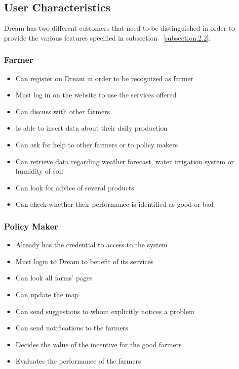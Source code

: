 \subsection{User Characteristics}
Dream has two different customers that need to be 
distinguished in order to provide the various 
features specified in subsection ~\ref{subsection:2.2}.

\subsubsection{Farmer}
\begin{itemize}
    \renewcommand\labelitemi{--}
    \item Can register on Dream in order to be recognized as farmer
    \item Must log in on the website to use the services offered
    \item Can discuss with other farmers
    \item Is able to insert data about their daily production
    \item Can ask for help to other farmers or to policy makers
    \item Can retrieve data regarding weather forecast, water irrigation system or humidity of soil
    \item Can look for advice of several products
    \item Can check whether their performance is identified as good or bad
\end{itemize}

\subsubsection{Policy Maker}

\begin{itemize}
    \renewcommand\labelitemi{--}
    \item Already has the credential to access to the system
    \item Must login to Dream to benefit of its services
    \item Can look all farms' pages
    \item Can update the map
    \item Can send suggestions to whom explicitly notices a problem
    \item Can send notifications to the farmers
    \item Decides the value of the incentive for the good farmers
    \item Evaluates the performance of the farmers
\end{itemize}


